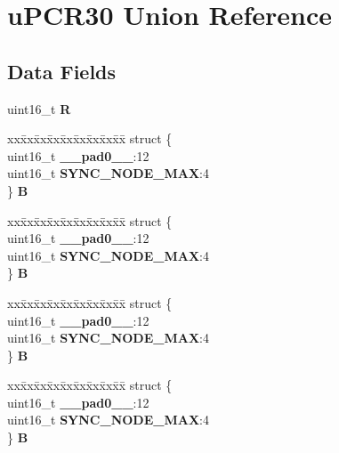 \hypertarget{unionuPCR30}{}\section{u\+P\+C\+R30 Union Reference}
\label{unionuPCR30}
\subsection*{Data Fields}
\begin{DoxyCompactItemize}
\item 
\mbox{\label{unionuPCR30_af799202933581855f6a873cdf64697e6}} 
uint16\+\_\+t {\bfseries R}
\item 
\mbox{\label{unionuPCR30_a4c61e57da6f8ab2bc8e19e9ebbb13fe4}} 
\begin{tabbing}
xx\=xx\=xx\=xx\=xx\=xx\=xx\=xx\=xx\=\kill
struct \{\\
\>uint16\_t {\bfseries \_\_pad0\_\_}:12\\
\>uint16\_t {\bfseries SYNC\_NODE\_MAX}:4\\
\} {\bfseries B}\\

\end{tabbing}\item 
\mbox{\label{unionuPCR30_ae35f3759182f594eb9ed23662912f567}} 
\begin{tabbing}
xx\=xx\=xx\=xx\=xx\=xx\=xx\=xx\=xx\=\kill
struct \{\\
\>uint16\_t {\bfseries \_\_pad0\_\_}:12\\
\>uint16\_t {\bfseries SYNC\_NODE\_MAX}:4\\
\} {\bfseries B}\\

\end{tabbing}\item 
\mbox{\label{unionuPCR30_a6378e1d03d301f3d658a00a9cded6df8}} 
\begin{tabbing}
xx\=xx\=xx\=xx\=xx\=xx\=xx\=xx\=xx\=\kill
struct \{\\
\>uint16\_t {\bfseries \_\_pad0\_\_}:12\\
\>uint16\_t {\bfseries SYNC\_NODE\_MAX}:4\\
\} {\bfseries B}\\

\end{tabbing}\item 
\mbox{\label{unionuPCR30_a12cfc79bdd5cf2c4be2d1a75ac0b8131}} 
\begin{tabbing}
xx\=xx\=xx\=xx\=xx\=xx\=xx\=xx\=xx\=\kill
struct \{\\
\>uint16\_t {\bfseries \_\_pad0\_\_}:12\\
\>uint16\_t {\bfseries SYNC\_NODE\_MAX}:4\\
\} {\bfseries B}\\

\end{tabbing}\end{DoxyCompactItemize}


